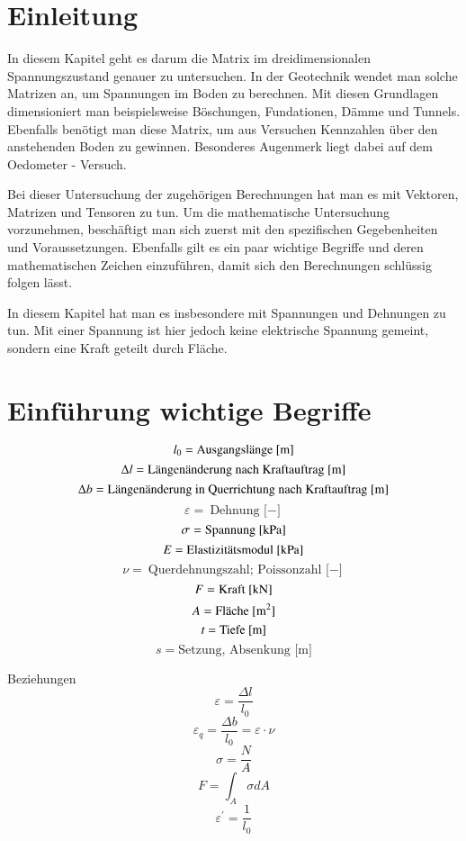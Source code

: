 \section{Einleitung\label{spannung:section:Einleitung}}
In diesem Kapitel geht es darum die Matrix im dreidimensionalen Spannungszustand genauer zu untersuchen.
In der Geotechnik wendet man solche Matrizen an, um Spannungen im Boden zu berechnen.
Mit diesen Grundlagen dimensioniert man beispielsweise Böschungen, Fundationen, Dämme und Tunnels.
Ebenfalls benötigt man diese Matrix, um aus Versuchen Kennzahlen über den anstehenden Boden zu gewinnen.
Besonderes Augenmerk liegt dabei auf dem Oedometer - Versuch.

Bei dieser Untersuchung der zugehörigen Berechnungen hat man es mit Vektoren, Matrizen und Tensoren zu tun.
Um die mathematische Untersuchung vorzunehmen, beschäftigt man sich zuerst mit den spezifischen Gegebenheiten und Voraussetzungen.
Ebenfalls gilt es ein paar wichtige Begriffe und deren mathematischen Zeichen einzuführen,
damit sich den Berechnungen schlüssig folgen lässt.

In diesem Kapitel hat man es insbesondere mit Spannungen und Dehnungen zu tun.
Mit einer Spannung ist hier jedoch keine elektrische Spannung gemeint,
sondern eine Kraft geteilt durch Fläche.

\section{Einführung wichtige Begriffe\label{spannung:section:Wichtige Begriffe}}
\[
l_0
=
\text{Ausgangslänge [\si{\meter}]}
\]
\[
\Delta l
=
\text{Längenänderung nach Kraftauftrag [\si{\meter}]}
\]
\[
\Delta b
=
\text{Längenänderung in Querrichtung nach Kraftauftrag [\si{\meter}]}
\]
\[
\varepsilon
=
\text{Dehnung [$-$]}
\]
\[
\sigma
=
\text{Spannung [\si{\kilo\pascal}]}
\]
\[
E
=
\text{Elastizitätsmodul [\si{\kilo\pascal}]}
\]
\[
\nu
=
\text{Querdehnungszahl; Poissonzahl [$-$]}
\]
\[
F
=
\text{Kraft [\si{\kilo\newton}]}
\]
\[
A
=
\text{Fläche [\si{\meter\squared}]}
\]
\[
t
=
\text{Tiefe [\si{\meter}]}
\]
\[
s
=
\text{Setzung, Absenkung [m]}
\]

Beziehungen
\[
\varepsilon
=
\frac{\Delta l}{l_0}
\]
\[
\varepsilon_q
=
\frac{\Delta b}{l_0}
=
\varepsilon\cdot\nu
\]
\[
\sigma
=
\frac{N}{A}
\]
\[
F
=
\int_{A} \sigma dA
\]
\[
\varepsilon^{\prime}
=
\frac{1}{l_0}
\]

